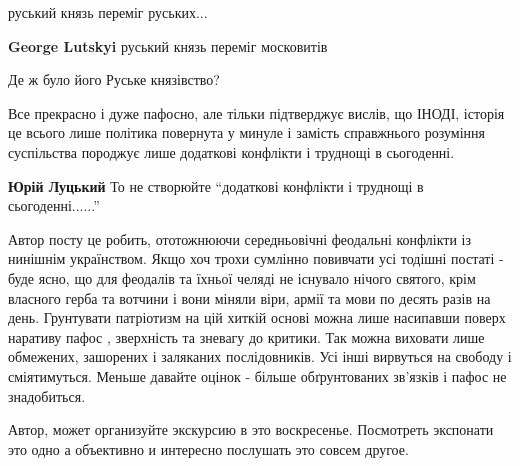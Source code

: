 \begin{itemize}
руський князь переміг руських...

\begin{itemize} %
\textbf{George Lutskyi} руський князь переміг московитів

Де ж було його Руське князівство?

\begin{itemize} %

Все прекрасно і дуже пафосно, але тільки підтверджує вислів, що ІНОДІ, історія
це всього лише політика повернута у минуле і замість справжнього розуміння
суспільства породжує лише додаткові конфлікти і труднощі в сьогоденні.


\textbf{Юрій Луцький} То не створюйте \enquote{додаткові конфлікти і труднощі в сьогоденні......}


Автор посту це робить, ототожнюючи середньовічні феодальні конфлікти із
нинішнім українством. Якщо хоч трохи сумлінно повивчати усі тодішні постаті -
буде ясно, що для феодалів та їхньої челяді не існувало нічого святого, крім
власного герба та вотчини і вони міняли віри, армії та мови по десять разів на
день. Грунтувати патріотизм на цій хиткій основі можна лише насипавши поверх
наративу пафос , зверхність та зневагу до критики. Так можна виховати лише
обмежених, зашорених і заляканих послідовників. Усі інші вирвуться на свободу і
сміятимуться. Меньше давайте оцінок - більше обґрунтованих зв'язків і пафос не
знадобиться.

\end{itemize} %

\end{itemize} %

Автор, может организуйте экскурсию в это воскресенье.
Посмотреть экспонати это одно а объективно и интересно послушать это совсем другое.

\end{itemize} %
